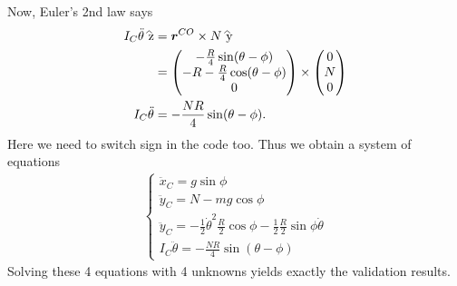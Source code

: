 \documentclass[12pt]{article}
\begin{document}
Now, Euler's 2nd law says
\begin{align*}
	I_C \ddot{\theta} \wh{ z}&= \ve{ r}^{CO} \times  N \wh{ y}   \\
	&= \begin{pmatrix} -\frac{R}{4} \sin(\theta-\phi) \\ -R-\frac{R}{4} \cos(\theta-\phi)\\0 \end{pmatrix} \times   \begin{pmatrix} 0\\N\\0 \end{pmatrix} \\
	I_C \ddot{\theta}&=- \frac{NR}{4} \sin(\theta - \phi) .
\end{align*}
Here we need to switch sign in the code too. Thus we obtain a system of equations
\begin{align*}
\begin{cases}
	\ddot{x}_C = g \sin\phi\\
	\ddot{y}_C = N - mg \cos \phi \\
	\ddot{y}_C = - \frac{1}{2}\dot{\theta}^2 \frac{R}{2} \cos \phi - \frac{1}{2}\frac{R}{2} \sin \phi \dot{\theta} \\
	I_C \ddot{\theta} =-\frac{NR}{4} \sin(\theta - \phi) 
\end{cases}
\end{align*}
Solving these 4 equations with 4 unknowns yields exactly the validation results.
\end{document}
